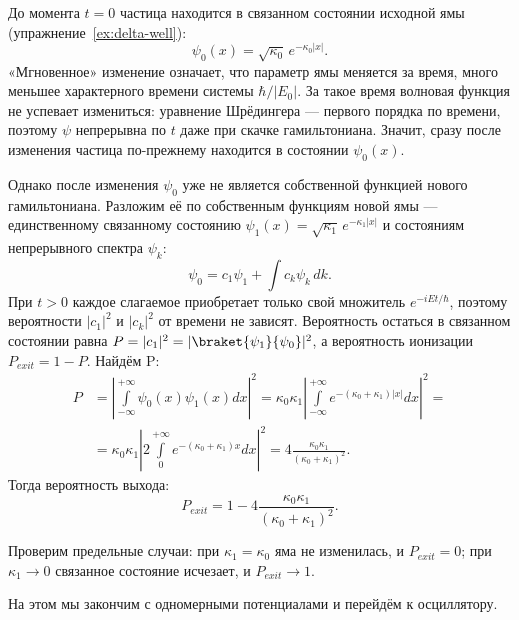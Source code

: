 До момента $t = 0$ частица находится в связанном состоянии исходной ямы
(упражнение \textnumero\,\ref{ex:delta-well}):
\[
  \psi_0(x) = \sqrt{\kappa_0}\,e^{-\kappa_0|x|}.
\]
«Мгновенное» изменение означает, что параметр ямы меняется за время, много
меньшее характерного времени системы $\hbar/|E_0|$. За такое время волновая
функция не успевает измениться: уравнение Шрёдингера --- первого порядка по
времени, поэтому $\psi$ непрерывна по $t$ даже при скачке гамильтониана. Значит,
сразу после изменения частица по-прежнему находится в состоянии $\psi_0(x)$.

Однако после изменения $\psi_0$ уже не является собственной функцией нового
гамильтониана. Разложим её по собственным функциям новой ямы --- единственному
связанному состоянию $\psi_1(x) = \sqrt{\kappa_1}\,e^{-\kappa_1|x|}$ и
состояниям непрерывного спектра $\psi_k$:
\[
  \psi_0 = c_1\psi_1 + \int c_k\psi_k\,dk.
\]
При $t > 0$ каждое слагаемое приобретает только свой множитель
$e^{-iEt/\hbar}$, поэтому вероятности $|c_1|^2$ и $|c_k|^2$ от времени не
зависят. Вероятность остаться в связанном состоянии равна $P = |c_1|^2 =
  |\braket{\psi_1}{\psi_0}|^2$, а вероятность ионизации $P_{exit} = 1-P$. Найдём
P:
\begin{align*}
  P &= \left|\int\limits_{-\infty}^{+\infty}\psi_0(x)\psi_1(x)dx\right|^2 =
  \kappa_0\kappa_1\left|\int\limits_{-\infty}^{+\infty} e^{-(\kappa_0 +
      \kappa_1)|x|}dx\right|^2 =\\
  &= \kappa_0\kappa_1\left|2\int\limits_{0}^{+\infty} e^{-(\kappa_0 +
      \kappa_1)x}dx\right|^2 = 4\frac{\kappa_0\kappa_1}{(\kappa_0 + \kappa_1)^2}.
\end{align*}
Тогда вероятность выхода:
\[
  P_{exit} = 1 - 4\frac{\kappa_0\kappa_1}{(\kappa_0 + \kappa_1)^2}.
\]

Проверим предельные случаи: при $\kappa_1 = \kappa_0$ яма не изменилась, и
$P_{exit} = 0$; при $\kappa_1 \to 0$ связанное состояние исчезает, и $P_{exit}
  \to 1$.
\qedsq

На этом мы закончим с одномерными потенциалами и перейдём к осциллятору.
